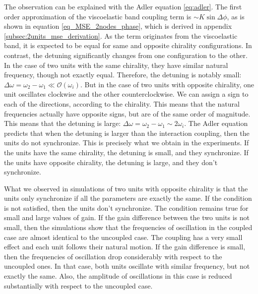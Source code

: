\documentclass[11pt, a4paper]{article} %
\newcommand{\bigO}{\mathcal{O}}
\begin{document}
The observation can be explained with the Adler equation \eqref{eq:adler}. The first order approximation 
of the viscoelastic band coupling term is $\sim K\sin{\Delta\phi}$, as is shown in equation \eqref{eq_MSE_2nodes_phase}, 
which is derived in appendix \ref{subsec:2units_mse_derivation}. As the term originates from the viscoelastic band, 
it is expected to be equal for same and opposite chirality configurations. In contrast, the detuning 
significantly changes from one configuration to the other. In the case of two units with the same chirality, they have 
similar natural frequency, though not exactly equal. Therefore, the detuning is notably small: 
$\Delta \omega = \omega_2 - \omega_1 \ll \bigO(\omega_i)$. But in the case of two units with opposite chirality, 
one unit oscillates clockwise and the other counterclockwise. We can assign a sign to each of the directions, 
according to the chirality. This means that the natural frequencies actually have opposite signs, but are of the same 
order of magnitude. This means that the detuning is large: $\Delta \omega = \omega_2 - \omega_1 \sim  2\omega_i$. 
The Adler equation predicts that when the detuning is larger than the interaction coupling, then the units do not synchronize. 
This is precisely what we obtain in the experiments. If the units have the same chirality, the detuning is small, and they synchronize. 
If the units have opposite chirality, the detuning is large, and they don't synchronize. 

What we observed in simulations of two units with opposite chirality is that the units only synchronize if 
all the parameters are exactly the same. If the condition is not satisfied, then the units don't synchronize. The condition remains 
true for small and large values of gain. 
If the gain difference between the two units is not small, then the simulations show that the frequencies 
of oscillation in the coupled case are almost identical to the uncoupled case. The coupling 
has a very small effect and each unit follows their natural motion. 
If the gain difference is small, then the frequencies of oscillation drop considerably with respect to the 
uncoupled ones. In that case, both units oscillate with similar frequency, but not exactly the same. 
Also, the amplitude of oscillations in this case is reduced substantially with respect to the uncoupled case.
\end{document}
